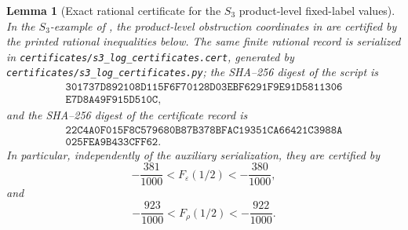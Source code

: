 \documentclass[11pt,a4paper]{amsart}
\theoremstyle{plain}
\newtheorem{lemma}[theorem]{Lemma}
\theoremstyle{definition}
\theoremstyle{remark}
\begin{document}
\begin{lemma}[Exact rational certificate for the \(S_3\) product-level
  fixed-label values]
  \label{lem:appendix-s3-f-level-certificates}
  In the \(S_3\)-example of , the product-level
  obstruction coordinates in  are
  certified by the printed rational inequalities below.  The same finite
  rational record is serialized in
  \texttt{certificates/s3\_log\_certificates.cert}, generated by
  \texttt{certificates/s3\_log\_certificates.py}; the SHA--256 digest of the
  script is
  \[
  \begin{array}{l}
    \texttt{301737D892108D115F6F70128D03EBF6291F9E91D5811306}\\
    \texttt{E7D8A49F915D510C},
  \end{array}
  \]
  and the SHA--256 digest of the certificate record is
  \[
  \begin{array}{l}
    \texttt{22C4A0F015F8C579680B87B378BFAC19351CA66421C3988A}\\
    \texttt{025FEA9B433CFF62}.
  \end{array}
  \]
  In particular, independently of the auxiliary serialization, they are
  certified by
  \begin{equation}\label{eq:s3-f-epsilon-appendix-window}
    -\frac{381}{1000}<F_\varepsilon(1/2)<-\frac{380}{1000},
  \end{equation}
  and
  \begin{equation}\label{eq:s3-f-rho-appendix-window}
    -\frac{923}{1000}<F_\rho(1/2)<-\frac{922}{1000}.
  \end{equation}
\end{lemma}
\end{document}
